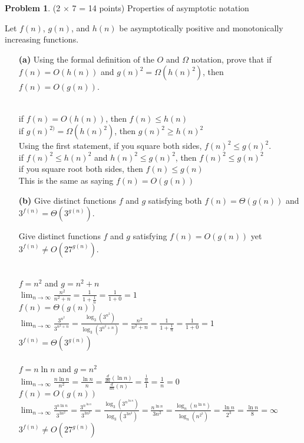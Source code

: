 \documentclass[11pt]{article}
\theoremstyle{definition}
\theoremstyle{theorem}
\newtheorem{prob}{Problem}
\newcommand{\solution}[1]{\medskip\noindent{\color{DarkBlue}\textbf{Solution:}} #1}
\newcommand{\solution}[1]{}
\begin{document}
\newpage

\begin{prob}
\label{prob:asymptotics}
(2 $\times$ 7 = 14 points) Properties of asymptotic notation
\end{prob}

\noindent Let $f(n)$, $g(n)$, and $h(n)$ be asymptotically positive
and monotonically increasing functions.  
\begin{itemize}
\item[{\bf (a)}] Using the formal definition of the $O$ and $\Omega$
  notation, prove that if $f(n) = O(h(n))$ and $g(n)^2 = \Omega(h(n)^2)$,
  then $f(n) = O(g(n))$.

\solution{ \\
if $f(n) = O(h(n))$, then $f(n) \le h(n)$ \\
if $g(n)^{2)} = \Omega(h(n)^{2})$, then $g(n)^{2} \ge h(n)^{2}$ \\
Using the first statement, if you square both sides, $f(n)^{2} \le g(n)^{2}$. \\
if $f(n)^{2} \le h(n)^{2}$ and $h(n)^{2} \le g(n)^{2}$, then $f(n)^{2} \le g(n)^{2}$ \\
if you square root both sides, then $f(n) \le g(n)$ \\
This is the same as saying $f(n) = O(g(n))$
}

\item[{\bf (b)}] Give distinct functions $f$ and $g$ satisfying both
  $f(n) = \Theta(g(n))$ and $3^{f(n)} = \Theta(3^{g(n)})$.

  Give distinct functions $f$ and $g$ satisfying $f(n) = O(g(n))$ yet
  $3^{f(n)} \neq O(27^{g(n)})$.

\solution{ \\
$f = n^{2}$ and $g = n^{2} + n$ \\
$\lim_{n \to \infty} \frac{n^{2}}{n^{2} + n} = \frac{1}{1 + \frac{1}{n}} = \frac{1}{1 + 0} = 1$ \\
$f(n) = \Theta(g(n))$ \\
$\lim_{n \to \infty} \frac{3^{n^{2}}}{3^{n^{2} + n}} = \frac{\log_3(3^{n^{2}})}{\log_3(3^{n^{2} + n})} = \frac{n^{2}}{n^{2} + n} = \frac{1}{1 + \frac{1}{n}} = \frac{1}{1 + 0} = 1$ \\
$3^{f(n)} = \Theta(3^{g(n)})$ \\\\
$f = n \ln n$ and $g = n^{2}$ \\
$\lim_{n \to \infty} \frac{n \ln n}{n^{2}} = \frac{\ln n}{n} = \frac{\frac{d}{dn}(\ln n)}{\frac{d}{dn}(n)} = \frac{\frac{1}{n}}{1} = \frac{1}{n} = 0$ \\
$f(n) = O(g(n))$ \\
$\lim_{n \to \infty} \frac{3^{n \ln n}}{3^{3n^{2}}} = \frac{3^{n^{\ln n}}}{3^{3n^{2}}} = \frac{\log_3(3^{n^{\ln n}})}{\log_3(3^{3n^{2}})} = \frac{n^{\ln n}}{3n^{2}} = \frac{\log_n(n^{\ln n})}{\log_n(n^{2^{3}})} = \frac{\ln n}{2^{3}} = \frac{\ln n}{8} = \infty$ \\
$3^{f(n)} \not= O(27^{g(n)})$
}
\end{itemize}
\end{document}
